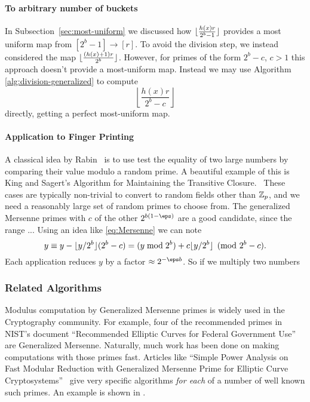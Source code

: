 \paragraph{To arbitrary number of buckets}
In Subsection~\ref{sec:most-uniform} we discussed how $\lfloor {\frac{h(x)r}{2^b-1}} \rfloor$ provides a most uniform map from $[2^b-1]\to[r]$.
To avoid the division step, we instead considered the map
$\lfloor {\frac{(h(x)+1)r}{2^b}} \rfloor$.
However, for primes of the form $2^b-c$, $c>1$ this approach doesn't provide a most-uniform map.
%
Instead we may use Algorithm \ref{alg:division-generalized} to compute
$$\left\lfloor\frac{h(x)r}{2^b-c}\right\rfloor$$
directly, getting a perfect most-uniform map.

\paragraph{Application to Finger Printing}
A classical idea by Rabin~\cite{rabin1981fingerprinting} is to use test the equality of two large numbers by comparing their value modulo a random prime.
A beautiful example of this is King and Sagert's Algorithm for Maintaining the Transitive Closure.~\cite{DBLP:journals/jcss/KingS02}
These cases are typically non-trivial to convert to random fields other than $\mathbb Z_p$, and we need a reasonably large set of random primes to choose from.
The generalized Mersenne primes with $c$ of the other $2^{b(1-\eps)}$ are a good candidate, since the range ...
Using an idea like \eqref{eq:Mersenne} we can note
\begin{equation}
   y \equiv y - \lfloor {y/2^b} \rfloor(2^b-c)
   = (y\bmod 2^{b}) + c\lfloor {y/2^b} \rfloor
   \pmod {2^b-c}.
\end{equation}
Each application reduces $y$ by a factor $\approx 2^{-\eps b}$.
So if we multiply two numbers 

\subsubsection{Related Algorithms}

Modulus computation by Generalized Mersenne primes is widely used in the Cryptography community.
For example, four of the recommended primes in NIST's document ``Recommended Elliptic Curves for Federal Government Use''~\cite{nist} are Generalized Mersenne.
Naturally, much work has been done on making computations with those primes fast.
Articles like ``Simple Power Analysis on Fast Modular Reduction with Generalized Mersenne Prime for Elliptic Curve Cryptosystems''~\cite{sakai2006simple}
give very specific algorithms \emph{for each} of a number of well known such primes.
An example is shown in .

